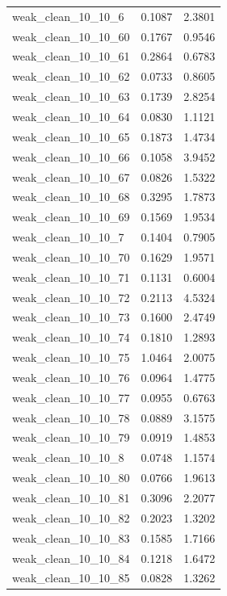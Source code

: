 \begin{longtable}{lcc}
weak\_clean\_10\_10\_6     &   0.1087 &  2.3801 \\
weak\_clean\_10\_10\_60    &   0.1767 &  0.9546 \\
weak\_clean\_10\_10\_61    &   0.2864 &  0.6783 \\
weak\_clean\_10\_10\_62    &   0.0733 &  0.8605 \\
weak\_clean\_10\_10\_63    &   0.1739 &  2.8254 \\
weak\_clean\_10\_10\_64    &   0.0830 &  1.1121 \\
weak\_clean\_10\_10\_65    &   0.1873 &  1.4734 \\
weak\_clean\_10\_10\_66    &   0.1058 &  3.9452 \\
weak\_clean\_10\_10\_67    &   0.0826 &  1.5322 \\
weak\_clean\_10\_10\_68    &   0.3295 &  1.7873 \\
weak\_clean\_10\_10\_69    &   0.1569 &  1.9534 \\
weak\_clean\_10\_10\_7     &   0.1404 &  0.7905 \\
weak\_clean\_10\_10\_70    &   0.1629 &  1.9571 \\
weak\_clean\_10\_10\_71    &   0.1131 &  0.6004 \\
weak\_clean\_10\_10\_72    &   0.2113 &  4.5324 \\
weak\_clean\_10\_10\_73    &   0.1600 &  2.4749 \\
weak\_clean\_10\_10\_74    &   0.1810 &  1.2893 \\
weak\_clean\_10\_10\_75    &   1.0464 &  2.0075 \\
weak\_clean\_10\_10\_76    &   0.0964 &  1.4775 \\
weak\_clean\_10\_10\_77    &   0.0955 &  0.6763 \\
weak\_clean\_10\_10\_78    &   0.0889 &  3.1575 \\
weak\_clean\_10\_10\_79    &   0.0919 &  1.4853 \\
weak\_clean\_10\_10\_8     &   0.0748 &  1.1574 \\
weak\_clean\_10\_10\_80    &   0.0766 &  1.9613 \\
weak\_clean\_10\_10\_81    &   0.3096 &  2.2077 \\
weak\_clean\_10\_10\_82    &   0.2023 &  1.3202 \\
weak\_clean\_10\_10\_83    &   0.1585 &  1.7166 \\
weak\_clean\_10\_10\_84    &   0.1218 &  1.6472 \\
weak\_clean\_10\_10\_85    &   0.0828 &  1.3262 \\

\end{longtable}
